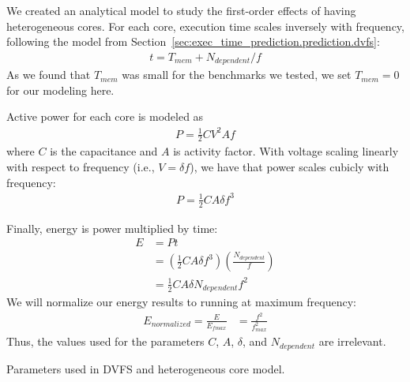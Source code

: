 We created an analytical model to study the first-order effects of having
heterogeneous cores. For each core, execution time scales inversely with
frequency, following the model from
Section~\ref{sec:exec_time_prediction.prediction.dvfs}:
\begin{align*}
  t = T_{mem} + N_{dependent}/f
\end{align*}
As we found that $T_{mem}$ was small for the benchmarks we tested, we set $T_{mem}
= 0$ for our modeling here.

Active power for each core is modeled as
\begin{align*}
  P = \frac{1}{2}CV^2Af
\end{align*}
where $C$ is the capacitance and $A$ is activity factor. With voltage scaling
linearly with respect to frequency (i.e., $V = \delta f$), we have that power
scales cubicly with frequency:
\begin{align*}
  P = \frac{1}{2}CA\delta f^3
\end{align*}

Finally, energy is power multiplied by time:
\begin{align*}
  E &= Pt \\
    &= \left(\frac{1}{2}CA\delta f^3\right) \left(\frac{N_{dependent}}{f}\right) \\
    &= \frac{1}{2}CA\delta N_{dependent}f^2
\end{align*}
We will normalize our energy results to running at maximum frequency:
\begin{align*}
  E_{normalized} = \frac{E}{E_{fmax}} &= \frac{f^2}{f_{max}^2}
\end{align*}
Thus, the values used for the parameters $C$, $A$, $\delta$, and
$N_{dependent}$ are irrelevant.

\begin{table}
  \begin{center}
    \begin{footnotesize}
    
    \end{footnotesize}
    \caption{Parameters used in DVFS and heterogeneous core model.}
    \label{tab:exec_time_prediction.evaluation.model_params}
  \end{center}
\end{table}

